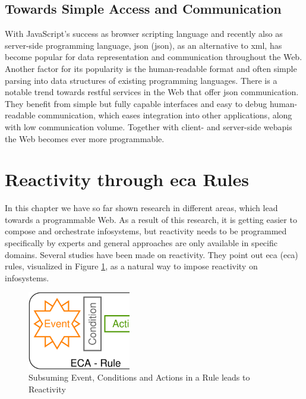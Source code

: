 \subsection{Towards Simple Access and Communication}
With JavaScript's success as browser scripting language and recently also as server-side programming language, \textrm{\acrlong{json} (\acrshort{json})}, as an alternative to \textrm{\acrshort{xml}}, has become popular for data representation and communication throughout the Web.
Another factor for its popularity is the human-readable format and often simple parsing into data structures of existing programming languages.
There is a notable trend towards \textrm{\acrshort{rest}ful} services in the Web that offer \textrm{\acrshort{json}} communication.
They benefit from simple but fully capable interfaces and easy to debug human-readable communication, which eases integration into other applications, along with low communication volume.
Together with client- and server-side \textrm{\gls{webapi}s} the Web becomes ever more programmable.



\section{Reactivity through \acrlong{eca} Rules}
In this chapter we have so far shown research in different areas, which lead towards a programmable Web.
As a result of this research, it is getting easier to compose and orchestrate \textrm{\glspl{infosystem}}, but reactivity needs to be programmed specifically by experts and general approaches are only available in specific domains.
Several studies\cite{2007_AlferesR3}\cite{2005-Bry_etal-XChange.pdf}\cite{10.1007-11896548_63}\cite{papamarkos2004rdftl}\cite{2012-Paschke_etal-ReactionRuleML.pdf} have been made on reactivity.
They point out \textrm{\acrlong{eca} (\acrshort{eca})} rules, visualized in Figure \ref{fig:ECA-Explanation}, as a natural way to impose reactivity on \textrm{\glspl{infosystem}}.
\begin{figure}[!ht]
  \centering
  \includegraphics[width=0.4\textwidth]{figures/ECA-Explanation}
  \caption{Subsuming Event, Conditions and Actions in a Rule leads to Reactivity}
  \label{fig:ECA-Explanation}
\end{figure}

